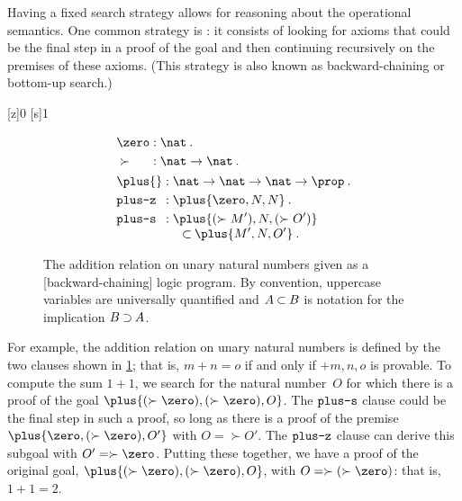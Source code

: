 Having a fixed search strategy allows for reasoning about the operational semantics.
One common strategy is : it consists of
looking for axioms that could be the final step in a proof of the goal and then
continuing recursively on the premises of these axioms.
(This strategy is also known as backward-chaining or bottom-up search.)

\NewPredicate{\zero}[z]{0}
\RenewPredicate{\succ}[s]{1}
\begin{figure}[!tbp]
  \begin{align*}
    &\begin{alignedat}{2}
       &\zero &&: \nat \:. \\
       &\succ{} &&: \nat \to \nat \:.
     \end{alignedat}
    \\
    &\begin{alignedat}{2}
       &\plus{} &&: \nat \to \nat \to \nat \to \prop \:. \\
       &\rulename{plus-z} &&: \plus{\zero,N,N} \:. \\
       &\rulename{plus-s} &&: \!\begin{aligned}[t]
                                  \MoveEqLeft[0.5]
                                  \plus{(\succ{M'}),N,(\succ{O'})} \\[-\jot]
                                    &\pmi \plus{M',N,O'} \:.
                                \end{aligned}
     \end{alignedat}
  \end{align*}
  \caption{The addition relation on unary natural numbers given as a [backward-chaining] logic program.  By convention, uppercase variables are universally quantified and $A \mathbin{\subset} B$ is notation for the implication $B \mathbin{\supset} A$.\label{fig:plus-lp}}
\end{figure}
For example, the addition relation on unary natural numbers is defined by the two clauses shown in \cref{fig:plus-lp}; that is, $m + n = o$ if and only if $\plus{m,n,o}$ is provable.
To compute the sum $1 + 1$, we search for the natural number~$O$ for which there is a proof of the goal $\plus{(\succ{\zero}),(\succ{\zero}),O}$.
The $\text{\normalfont\ttfamily plus-s}$ clause could be the final step in such a proof, so long as there is a proof of the premise $\plus{\zero,(\succ{\zero}),O'}$ with $O = \succ{O'}$.
The $\text{\normalfont\ttfamily plus-z}$ clause can derive this subgoal with $O' = \succ{\zero}$.
Putting these together, we have a proof of the original goal, $\plus{(\succ{\zero}),(\succ{\zero}),O}$, with $O = \succ{(\succ{\zero})}$: that is, $1 + 1 = 2$.


